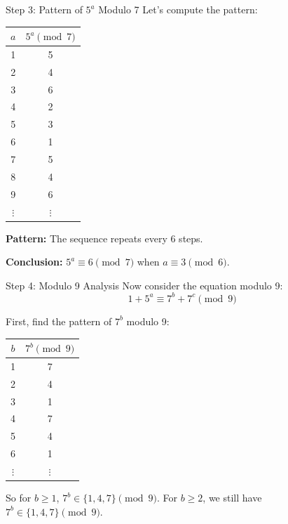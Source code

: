 \begin{frame}{Step 3: Pattern of $5^a$ Modulo 7}
    Let's compute the pattern:

    \begin{tabular}{c|c}
        $a$ & $5^a \pmod 7$ \\ \hline
        1 & 5 \\
        2 & 4 \\
        3 & 6 \\
        4 & 2 \\
        5 & 3 \\
        6 & 1 \\
        7 & 5 \\
        8 & 4 \\
        9 & 6 \\
        $\vdots$ & $\vdots$
    \end{tabular}

    \vspace{0.2cm}
    \textbf{Pattern:} The sequence repeats every 6 steps.

    \textbf{Conclusion:} $5^a \equiv 6 \pmod 7$ when $a \equiv 3 \pmod 6$.
\end{frame}

\begin{frame}{Step 4: Modulo 9 Analysis}
    Now consider the equation modulo 9:
    \[1 + 5^a \equiv 7^b + 7^c \pmod 9\]

    First, find the pattern of $7^b$ modulo 9:

    \begin{tabular}{c|c}
        $b$ & $7^b \pmod 9$ \\ \hline
        1 & 7 \\
        2 & 4 \\
        3 & 1 \\
        4 & 7 \\
        5 & 4 \\
        6 & 1 \\
        $\vdots$ & $\vdots$
    \end{tabular}

    \vspace{0.2cm}
    So for $b \geq 1$, $7^b \in \{1,4,7\} \pmod 9$. For $b \geq 2$, we still have $7^b \in \{1,4,7\} \pmod 9$.
\end{frame}

